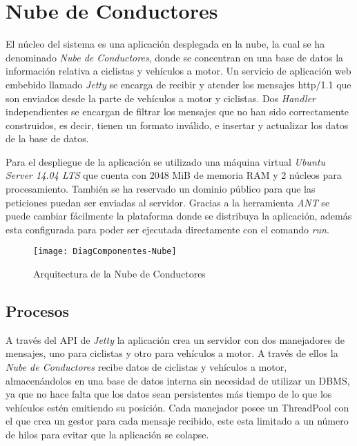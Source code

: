 \section{Nube de Conductores}\label{section:NubeConductores}
El núcleo del sistema es una aplicación desplegada en la nube, la cual se ha
denominado \emph{Nube de Conductores}, donde se concentran en una base de datos
la información relativa a ciclistas y vehículos a motor. Un servicio de aplicación
web embebido llamado \emph{Jetty} se encarga de recibir y atender los mensajes
\Gls{http/1.1} que son enviados desde la parte de vehículos a motor y ciclistas.
Dos \emph{Handler} independientes se encargan de filtrar los mensajes que no han
sido correctamente construidos, es decir, tienen un formato inválido, e insertar
y actualizar los datos de la base de datos.

Para el despliegue de la aplicación se utilizado una máquina virtual
\emph{Ubuntu Server 14.04 LTS} que cuenta con 2048 MiB de memoria RAM y 2 n\'ucleos
 para procesamiento. También se ha reservado un dominio público para que las peticiones
 puedan ser enviadas al servidor. Gracias a la herramienta \emph{ANT} se puede cambiar
 fácilmente la plataforma donde se distribuya la aplicación, además esta configurada para
 poder ser ejecutada directamente con el comando \emph{run}.

\begin{figure}[H]
	\begin{center}
		\texttt{[image: DiagComponentes-Nube]}
		\caption{Arquitectura de la Nube de Conductores}
		\label{fig:DiagComponentes-Nube}
	\end{center}
\end{figure}


\subsection{Procesos}\label{ssection:procesos}
A través del API de \emph{Jetty} la aplicación crea un servidor con dos manejadores
de mensajes, uno para ciclistas y otro para vehículos a motor. A través de ellos la
\emph{Nube de Conductores} recibe datos de ciclistas y vehículos a motor, almacenándolos
en una base de datos interna sin necesidad de utilizar un DBMS, ya que no hace falta
que los datos sean persistentes más tiempo de lo que los vehículos estén emitiendo
su posición. Cada manejador posee un ThreadPool con el que crea un gestor para cada
mensaje recibido, este esta limitado a un número de hilos para evitar que la aplicación
se colapse.

